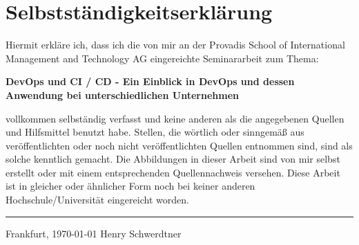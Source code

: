 \chapter*{\LARGE Selbstständigkeitserklärung}
\begin{onehalfspace}
Hiermit erkläre ich, dass ich die von mir an der Provadis School of International Management and Technology AG eingereichte Seminararbeit zum Thema:
\begin{center}
\textbf{DevOps und CI / CD - Ein Einblick in DevOps und dessen Anwendung bei unterschiedlichen Unternehmen}
\end{center}
vollkommen selbständig verfasst und keine anderen als die angegebenen Quellen und Hilfsmittel benutzt habe.
Stellen, die wörtlich oder sinngemäß aus veröffentlichten oder noch nicht veröffentlichten Quellen entnommen sind, sind als solche kenntlich gemacht.
Die Abbildungen in dieser Arbeit sind von mir selbst erstellt oder mit einem entsprechenden Quellennachweis versehen.
Diese Arbeit ist in gleicher oder ähnlicher Form noch bei keiner anderen Hochschule/Universität eingereicht worden.

\vspace{30 mm}
\begin{flushright}

\rule{90mm}{1pt}

Frankfurt, \today \hspace{15 mm} Henry Schwerdtner
\end{flushright}

\end{onehalfspace}